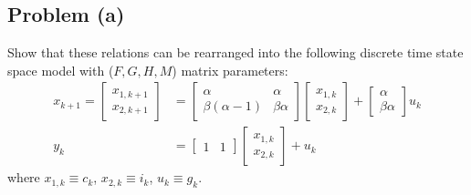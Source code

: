 \documentclass[11pt]{article}
\begin{document}
\subsection*{Problem (a)}
Show that these relations can be rearranged into the following discrete time state space model with ($F,G,H,M$) matrix parameters:
\begin{align*}
	x_{k+1} = \begin{bmatrix} x_{1,k+1} \\ x_{2,k+1} \end{bmatrix} &= \begin{bmatrix} \alpha & \alpha \\ \beta(\alpha-1) & \beta\alpha \end{bmatrix} \begin{bmatrix} x_{1,k} \\ x_{2,k} \end{bmatrix} + \begin{bmatrix} \alpha \\ \beta\alpha \end{bmatrix} u_k \\
	y_k &= \begin{bmatrix} 1 & 1 \end{bmatrix} \begin{bmatrix} x_{1,k} \\ x_{2,k} \end{bmatrix} + u_k
\end{align*}
where $x_{1,k}\equiv c_k$, $x_{2,k} \equiv i_k$, $u_k \equiv g_k$.
\end{document}
